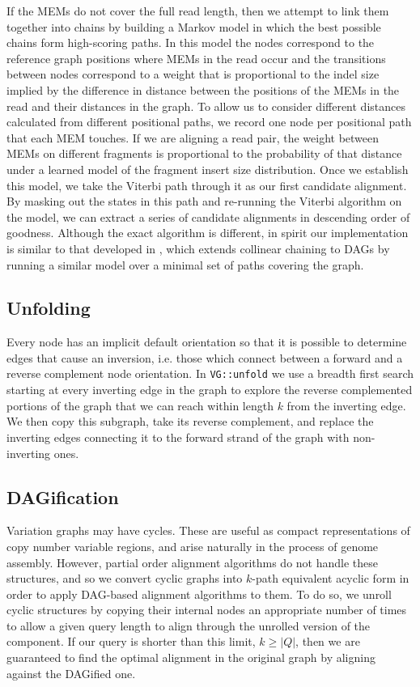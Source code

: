 If the MEMs do not cover the full read length, then we attempt to link them together into chains by building a Markov model in which the best possible chains form high-scoring paths. 
In this model the nodes correspond to the reference graph positions where MEMs in the read occur and the transitions between nodes correspond to a weight that is proportional to the indel size implied by the difference in distance between the positions of the MEMs in the read and their distances in the graph. 
To allow us to consider different distances calculated from different positional paths, we record one node per positional path that each MEM touches.
If we are aligning a read pair, the weight between MEMs on different fragments is proportional to the probability of that distance under a learned model of the fragment insert size distribution. 
Once we establish this model, we take the Viterbi path through it as our first candidate alignment. 
By masking out the states in this path and re-running the Viterbi algorithm on the model, we can extract a series of candidate alignments in descending order of goodness. 
Although the exact algorithm is different, in spirit our implementation is similar to that developed in \cite{kuosmanen2018using}, which extends collinear chaining to DAGs by running a similar model over a minimal set of paths covering the graph.

\subsection{Unfolding}

Every node has an implicit default orientation so that it is possible to determine edges that cause an inversion, i.e. those which connect between a forward and a reverse complement node orientation. 
In {\tt VG::unfold} we use a breadth first search starting at every inverting edge in the graph to explore the reverse complemented portions of the graph that we can reach within length $k$ from the inverting edge.
We then copy this subgraph, take its reverse complement, and replace the inverting edges connecting it to the forward strand of the graph with non-inverting ones.

\subsection{DAGification}
\label{sec:DAGify}

Variation graphs may have cycles.
These are useful as compact representations of copy number variable regions, and arise naturally in the process of genome assembly.
However, partial order alignment algorithms do not handle these structures, and so we convert cyclic graphs into $k$-path equivalent acyclic form in order to apply DAG-based alignment algorithms to them.
To do so, we unroll cyclic structures by copying their internal nodes an appropriate number of times to allow a given query length to align through the unrolled version of the component.
If our query is shorter than this limit, $k \geq |Q|$, then we are guaranteed to find the optimal alignment in the original graph by aligning against the DAGified one.

